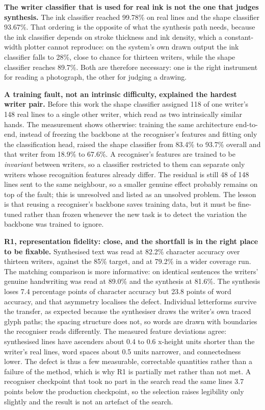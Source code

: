         \textbf{The writer classifier that is used for real ink is not the one that judges synthesis.}
        The ink classifier reached 99.78\% on real lines and the shape classifier 93.67\%.
        That ordering is the opposite of what the synthesis path needs, because the ink classifier depends on stroke thickness and ink density, which a constant-width plotter cannot reproduce: on the system's own drawn output the ink classifier falls to 28\%, close to chance for thirteen writers, while the shape classifier reaches 89.7\%.
        Both are therefore necessary: one is the right instrument for reading a photograph, the other for judging a drawing.

        \textbf{A training fault, not an intrinsic difficulty, explained the hardest writer pair.}
        Before this work the shape classifier assigned 118 of one writer's 148 real lines to a single other writer, which read as two intrinsically similar hands.
        The measurement shows otherwise: training the same architecture end-to-end, instead of freezing the backbone at the recogniser's features and fitting only the classification head, raised the shape classifier from 83.4\% to 93.7\% overall and that writer from 18.9\% to 67.6\%.
        A recogniser's features are trained to be \emph{invariant} between writers, so a classifier restricted to them can separate only writers whose recognition features already differ.
        The residual is still 48 of 148 lines sent to the same neighbour, so a smaller genuine effect probably remains on top of the fault; this is unresolved and listed as an unsolved problem.
        The lesson is that reusing a recogniser's backbone saves training data, but it must be fine-tuned rather than frozen whenever the new task is to detect the variation the backbone was trained to ignore.

        \textbf{R1, representation fidelity: close, and the shortfall is in the right place to be fixable.}
        Synthesised text was read at 82.2\% character accuracy over thirteen writers, against the 85\% target, and at 79.2\% in a wider coverage run.
        The matching comparison is more informative: on identical sentences the writers' genuine handwriting was read at 89.0\% and the synthesis at 81.6\%.
        The synthesis loses 7.4 percentage points of character accuracy but 23.8 points of word accuracy, and that asymmetry localises the defect.
        Individual letterforms survive the transfer, as expected because the synthesiser draws the writer's own traced glyph paths; the spacing structure does not, so words are drawn with boundaries the recogniser reads differently.
        The measured feature deviations agree: synthesised lines have ascenders about 0.4 to 0.6 x-height units shorter than the writer's real lines, word spaces about 0.5 units narrower, and connectedness lower.
        The defect is thus a few measurable, correctable quantities rather than a failure of the method, which is why R1 is partially met rather than not met.
        A recogniser checkpoint that took no part in the search read the same lines 3.7 points below the production checkpoint, so the selection raises legibility only slightly and the result is not an artefact of the search.

